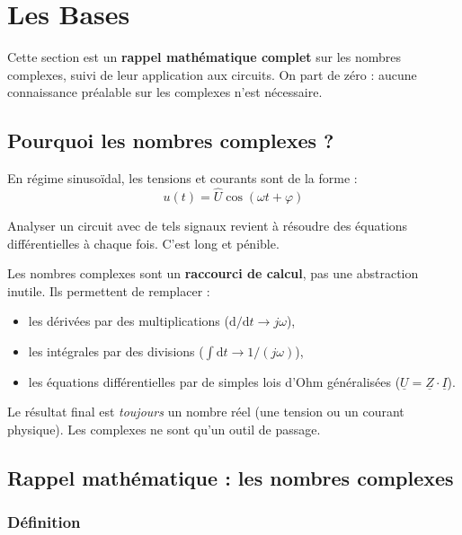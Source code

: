 \documentclass[12pt,a4paper,twoside]{book}
\begin{document}
\section{Les Bases}

\begin{bases}
Cette section est un \textbf{rappel mathématique complet} sur les nombres complexes, suivi de leur application aux circuits. On part de zéro : aucune connaissance préalable sur les complexes n'est nécessaire.
\end{bases}

\subsection{Pourquoi les nombres complexes ?}

En régime sinusoïdal, les tensions et courants sont de la forme :
\[
u(t) = \hat{U}\cos(\omega t + \varphi)
\]

Analyser un circuit avec de tels signaux revient à résoudre des équations différentielles à chaque fois. C'est long et pénible.

\begin{intuition}
Les nombres complexes sont un \textbf{raccourci de calcul}, pas une abstraction inutile. Ils permettent de remplacer :
\begin{itemize}[nosep]
\item les dérivées par des multiplications ($\mathrm{d}/\mathrm{d}t \to j\omega$),
\item les intégrales par des divisions ($\int\mathrm{d}t \to 1/(j\omega)$),
\item les équations différentielles par de simples lois d'Ohm généralisées ($\underline{U} = \underline{Z}\cdot\underline{I}$).
\end{itemize}
Le résultat final est \textit{toujours} un nombre réel (une tension ou un courant physique). Les complexes ne sont qu'un outil de passage.
\end{intuition}

\subsection{Rappel mathématique : les nombres complexes}

\subsubsection*{Définition}
\end{document}
